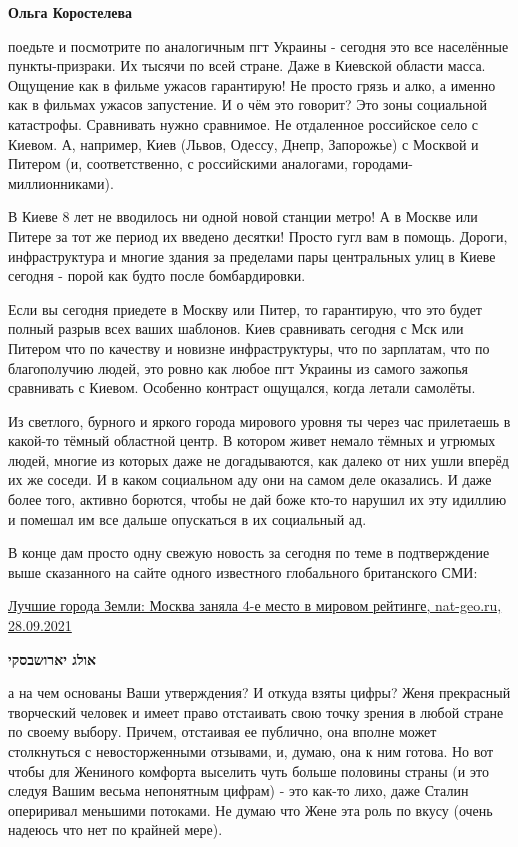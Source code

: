 \begin{itemize}
\begin{itemize}
\textbf{Ольга Коростелева} 

поедьте и посмотрите по аналогичным пгт Украины - сегодня это все населённые
пункты-призраки. Их тысячи по всей стране. Даже в Киевской области масса.
Ощущение как в фильме ужасов гарантирую! Не просто грязь и алко, а именно как в
фильмах ужасов запустение. И о чём это говорит? Это зоны социальной катастрофы.
Сравнивать нужно сравнимое. Не отдаленное российское село с Киевом. А,
например, Киев (Львов, Одессу, Днепр, Запорожье) с Москвой и Питером (и,
соответственно, с российскими аналогами, городами-миллионниками). 

В Киеве 8 лет не вводилось ни одной новой станции метро! А в Москве или Питере
за тот же период их введено десятки! Просто гугл вам в помощь. Дороги,
инфраструктура и многие здания за пределами пары центральных улиц в Киеве
сегодня - порой как будто после бомбардировки. 

Если вы сегодня приедете в Москву или Питер, то гарантирую, что это будет
полный разрыв всех ваших шаблонов. Киев сравнивать сегодня с Мск или Питером
что по качеству и новизне инфраструктуры, что по зарплатам, что по благополучию
людей, это ровно как любое пгт Украины из самого зажопья сравнивать с Киевом.
Особенно контраст ощущался, когда летали самолёты.

Из светлого, бурного и яркого города мирового уровня ты через час прилетаешь в
какой-то тёмный областной центр. В котором живет немало тёмных и угрюмых людей,
многие из которых даже не догадываются, как далеко от них ушли вперёд их же
соседи. И в каком социальном аду они на самом деле оказались. И даже более
того, активно борются, чтобы не дай боже кто-то нарушил их эту идиллию и
помешал им все дальше опускаться в их социальный ад.

В конце дам просто одну свежую новость за сегодня по теме в подтверждение выше
сказанного на сайте одного известного глобального британского СМИ:

\href{https://nat-geo.ru/planet/luchshie-goroda-zemli-moskva-zanyala-chetvertoe-mesto-v-mirovom-rejtinge}{%
Лучшие города Земли: Москва заняла 4-е место в мировом рейтинге, nat-geo.ru, 28.09.2021%
}

\textbf{אולג יארושבסקי} 

а на чем основаны Ваши утверждения? И откуда взяты цифры? Женя прекрасный
творческий человек и имеет право отстаивать свою точку зрения в любой стране по
своему выбору. Причем, отстаивая ее публично, она вполне может столкнуться с
невосторженными отзывами, и, думаю, она к ним готова. Но вот чтобы для Жениного
комфорта выселить чуть больше половины страны (и это следуя Вашим весьма
непонятным цифрам) - это как-то лихо, даже Сталин опериривал меньшими потоками.
Не думаю что Жене эта роль по вкусу (очень надеюсь что нет по крайней мере).


\end{itemize}
\end{itemize}
